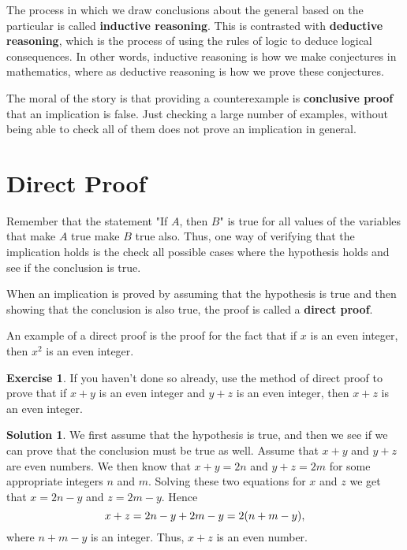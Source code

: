\documentclass[a4paper, 11pt]{report}
\theoremstyle{plain}
\theoremstyle{definition}
\newtheorem{exrc}[thm]{Exercise}
\newtheorem*{sltn}{Solution}
\begin{document}
The process in which we draw conclusions about the general based on the
particular is called \textbf{inductive reasoning}.
This is contrasted with \textbf{deductive reasoning}, which is the process of using the rules of logic to deduce logical
consequences.  In other words, inductive reasoning is how we make conjectures
in mathematics, where as deductive reasoning is how we prove these conjectures.

The moral of the story is that providing a counterexample is \textbf{conclusive
proof} that an implication is false. Just checking a
large number of examples, without being able to check all of them does not
prove an implication in general.

\section{Direct Proof}
\label{sec:direct_proof}

Remember that the statement "If $A$, then $B$" is true for all values of the
variables that make $A$ true make $B$ true also. Thus, one way of verifying
that the implication holds is the check all possible cases where the hypothesis
holds and see if the conclusion is true.

When an implication is proved by assuming that the hypothesis is true and then
showing that the conclusion is also true, the proof is called a \textbf{direct
proof}.

An example of a direct proof is the proof for the fact that if $x$ is an even
integer, then $x^2$ is an even integer.

\begin{exrc}
  If you haven't done so already, use the method of direct proof to prove that
  if $x + y$ is an even integer and $y + z$ is an even integer, then $x + z$
  is an even integer.
\end{exrc}
\begin{sltn}
  We first assume that the hypothesis is true, and then we see if we can prove
  that the conclusion must be true as well. Assume that $x + y$ and $y + z$ are
  even numbers.  We then know that $x + y = 2n$ and $y + z = 2m$ for some
  appropriate integers $n$ and $m$.  Solving these two equations for $x$ and
  $z$ we get that $x = 2n - y$ and $z = 2m - y$. Hence 
  \begin{equation}
    \notag
    x + z = 2n - y + 2m - y = 2(n + m - y),
  \end{equation}
  where $n + m - y$ is an integer. Thus, $x + z$ is an even number. 
\end{sltn}
\end{document}
